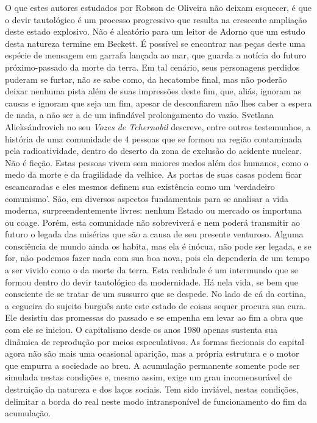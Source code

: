 O que estes autores estudados por Robson de Oliveira não deixam
esquecer, é que o devir tautológico é um processo progressivo que
resulta na crescente ampliação deste estado explosivo. Não é aleatório
para um leitor de Adorno que um estudo desta natureza termine em
Beckett. É possível se encontrar nas peças deste uma espécie de mensagem
em garrafa lançada ao mar, que guarda a notícia do futuro
próximo-passado da morte da terra. Em tal cenário, seus personagens
perdidos puderam se furtar, não se sabe como, da hecatombe final, mas
não poderão deixar nenhuma pista além de suas impressões deste fim, que,
aliás, ignoram as causas e ignoram que seja um fim, apesar de
desconfiarem não lhes caber a espera de nada, a não ser a de um
infindável prolongamento do vazio. Svetlana Alieksándrovich no seu
\emph{Vozes de Tchernobil} descreve, entre outros testemunhos, a
história de uma comunidade de 4 pessoas que se formou na região
contaminada pela radioatividade, dentro do deserto da zona de exclusão
do acidente nuclear. Não é ficção. Estas pessoas vivem sem maiores medos
além dos humanos, como o medo da morte e da fragilidade da velhice. As
portas de suas casas podem ficar escancaradas e eles mesmos definem sua
existência como um `verdadeiro comunismo'. São, em diversos aspectos
fundamentais para se analisar a vida moderna, surpreendentemente livres:
nenhum Estado ou mercado os importuna ou coage. Porém, esta comunidade
não sobreviverá e nem poderá transmitir ao futuro o legada das misérias
que são a causa de seu presente venturoso. Alguma consciência de mundo
ainda os habita, mas ela é inócua, não pode ser legada, e se for, não
podemos fazer nada com sua boa nova, pois ela dependeria de um tempo a
ser vivido como o da morte da terra. Esta realidade é um intermundo que
se formou dentro do devir tautológico da modernidade. Há nela vida, se
bem que consciente de se tratar de um sussurro que se despede. No lado
de cá da cortina, a cegueira do sujeito burguês ante este estado de
coisas sequer procura sua cura. Ele desistiu das promessas do passado e
se empenha em levar ao fim a obra que com ele se iniciou. O capitalismo
desde os anos 1980 apenas sustenta sua dinâmica de reprodução por meios
especulativos. As formas ficcionais do capital agora não são mais uma
ocasional aparição, mas a própria estrutura e o motor que empurra a
sociedade ao breu. A acumulação permanente somente pode ser simulada
nestas condições e, mesmo assim, exige um grau incomensurável de
destruição da natureza e dos laços sociais. Tem sido inviável, nestas
condições, delimitar a borda do real neste modo intransponível de
funcionamento do fim da acumulação.


